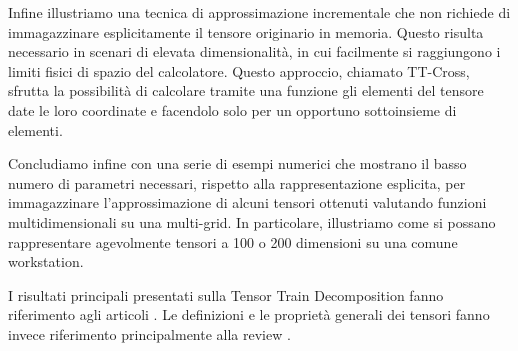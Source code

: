 \documentclass[11pt,a4paper]{article}
\begin{document}
Infine illustriamo una tecnica di approssimazione incrementale che non richiede di immagazzinare esplicitamente il tensore originario in memoria. Questo risulta necessario in scenari di elevata dimensionalità, in cui facilmente si raggiungono i limiti fisici di spazio del calcolatore.
Questo approccio, chiamato TT-Cross, sfrutta la possibilità di calcolare tramite una funzione gli elementi del tensore date le loro coordinate e facendolo solo per un opportuno sottoinsieme di elementi.

Concludiamo infine con una serie di esempi numerici che mostrano il basso numero di parametri necessari, rispetto alla rappresentazione esplicita, per immagazzinare l'approssimazione di alcuni tensori ottenuti valutando funzioni multidimensionali su una multi-grid. In particolare, illustriamo come si possano rappresentare agevolmente tensori a 100 o 200 dimensioni su una comune workstation.

I risultati principali presentati sulla Tensor Train Decomposition fanno riferimento agli articoli \cite{oseledetstyrty2009,oseledets2011tt,tt-cross}. Le definizioni e le proprietà generali dei tensori fanno invece riferimento principalmente alla review \cite{tensorreview}.

\vspace{2cm}



\end{document}
